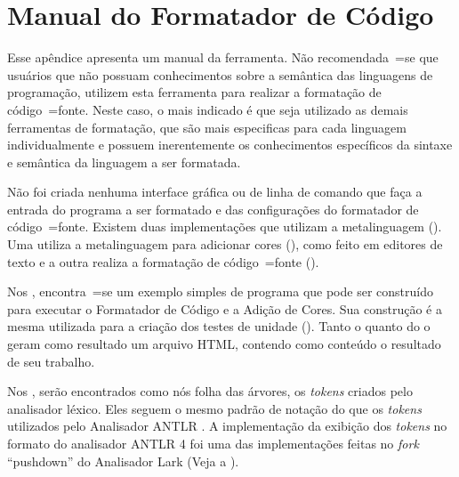

\chapter{Manual do Formatador de Código}
\label{manualDoFormatadorDeCodigo}


Esse apêndice apresenta um manual da ferramenta.
Não recomendada~=se que usuários que não possuam conhecimentos sobre a semântica das linguagens de programação,
utilizem esta ferramenta para realizar a formatação de código~=fonte.
Neste caso,
o mais indicado é que seja utilizado as demais ferramentas de formatação,
que são mais especificas para cada linguagem individualmente e
possuem inerentemente os conhecimentos específicos da sintaxe e
semântica da linguagem a ser formatada.

Não foi criada nenhuma interface gráfica ou
de linha de comando que faça a entrada do programa a ser formatado e
das configurações do formatador de código~=fonte.
Existem duas implementações que utilizam a metalinguagem ().
Uma utiliza a metalinguagem para adicionar cores (),
como feito em editores de texto e
a outra realiza a formatação de código~=fonte ().

Nos ,
encontra~=se um exemplo simples de programa que pode ser construído para executar o Formatador de Código e
a Adição de Cores.
Sua construção é a mesma utilizada para a criação dos testes de unidade ().
Tanto o  quanto do o  geram como resultado um arquivo HTML,
contendo como conteúdo o resultado de seu trabalho.

Nos ,
serão encontrados como nós folha das árvores,
os \textit{tokens} criados pelo analisador léxico.
Eles seguem o mesmo padrão de notação do que os \textit{tokens} utilizados pelo Analisador ANTLR \cite{antlrBookTerrentParr}.
A implementação da exibição dos \textit{tokens} no formato do analisador ANTLR 4 foi uma das implementações feitas no \textit{fork} ``pushdown'' do Analisador Lark (Veja a ).

